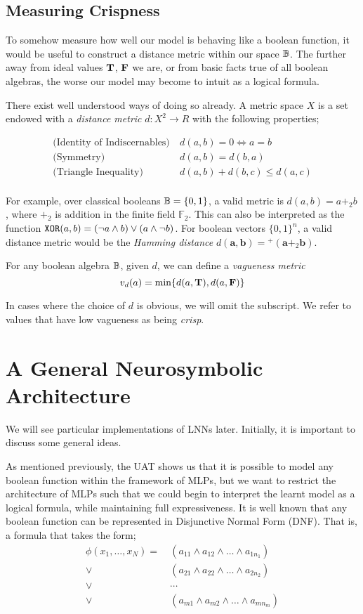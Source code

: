 \documentclass[conference]{report}
\begin{document}
\subsection{Measuring Crispness}

To somehow measure how well our model is behaving like a boolean function, it would be useful to construct a distance metric within our space $\mathbb{B}$. The further away from ideal values $\textbf{T}$, $\textbf{F}$ we are, or from basic facts true of all boolean algebras, the worse our model may become to intuit as a logical formula.

There exist well understood ways of doing so already. A metric space $X$ is a set endowed with a \textit{distance metric} $d: X^2 \to R$ with the following properties;

$$
\begin{aligned}
\text{(Identity of Indiscernables)}
&\ d(a, b) = 0 \iff a = b \\
\text{(Symmetry)}
&\ d(a, b) = d(b, a) \\
\text{(Triangle Inequality)}
&\ d(a, b) + d(b, c) \leq d(a, c) \\
\end{aligned}
$$

For example, over classical booleans $\mathbb{B} = \{0,1\}$, a valid metric is $d(a,b) = a +_2 b$, where $+_2$ is addition in the finite field $\mathbb{F}_2$. This can also be interpreted as the function $\texttt{XOR}(a,b) = (\neg a \land b) \lor (a \land \neg b)$. For boolean vectors $\{0,1\}^n$, a valid distance metric would be the \textit{Hamming distance} $d(\mathbf{a,b}) = {^+}(\mathbf{a} +_2 \mathbf{b})$.

For any boolean algebra $\mathbb{B}$, given $d$, we can define a \textit{vagueness metric}
$$v_d(a) = \min\{d(a, \textbf{T}), d(a, \textbf{F})\}$$

In cases where the choice of $d$ is obvious, we will omit the subscript. We refer to values that have low vagueness as being \textit{crisp}.

\section{A General Neurosymbolic Architecture}

We will see particular implementations of LNNs later. Initially, it is important to discuss some general ideas.

As mentioned previously, the UAT shows us that it is possible to model any boolean function within the framework of MLPs, but we want to restrict the architecture of MLPs such that we could begin to interpret the learnt model as a logical formula, while maintaining full expressiveness. It is well known that any boolean function can be represented in Disjunctive Normal Form (DNF). That is, a formula that takes the form;
$$
\begin{aligned}
\phi(x_1, \dots, x_N) =\ &(a_{11} \land a_{12} \land \dots \land a_{1n_1}) \\
\lor\ &(a_{21} \land a_{22} \land \dots \land a_{2n_2}) \\ 
\lor\ &\cdots \\
\lor\ &(a_{m1} \land a_{m2} \land \dots \land a_{mn_m})
\end{aligned}
$$
\end{document}

